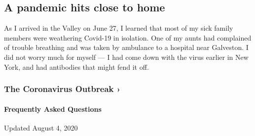 \hypertarget{a-pandemic-hits-close-to-home}{%
\subsection{A pandemic hits close to
home}\label{a-pandemic-hits-close-to-home}}

As I arrived in the Valley on June 27, I learned that most of my sick
family members were weathering Covid-19 in isolation. One of my aunts
had complained of trouble breathing and was taken by ambulance to a
hospital near Galveston. I did not worry much for myself --- I had come
down with the virus earlier in New York, and had antibodies that might
fend it off.

\href{https://www.nytimes3xbfgragh.onion/news-event/coronavirus?action=click\&pgtype=Article\&state=default\&region=MAIN_CONTENT_3\&context=storylines_faq}{}

\hypertarget{the-coronavirus-outbreak-}{%
\subsubsection{The Coronavirus Outbreak
›}\label{the-coronavirus-outbreak-}}

\hypertarget{frequently-asked-questions}{%
\paragraph{Frequently Asked
Questions}\label{frequently-asked-questions}}

Updated August 4, 2020

